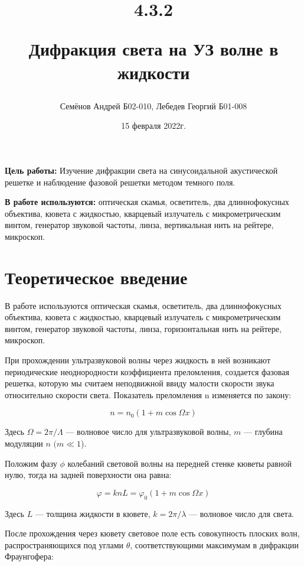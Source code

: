 \documentclass[a4paper,12pt]{article}
\title{4.3.2

Дифракция света на УЗ волне в жидкости}
\date{15 февраля 2022г.}
\author{Семёнов Андрей Б02-010, Лебедев Георгий Б01-008}
\begin{document}
		\vspace{0.5 cm}
	\maketitle
	\vspace{0.5 cm}
	
	\textbf{Цель работы:} Изучение дифракции света на синусоидальной акустической решетке и наблюдение фазовой решетки методом темного поля.
	
	\textbf{В работе используются:} оптическая скамья, осветитель, два длиннофокусных объектива, кювета с жидкостью, кварцевый излучатель с микрометрическим винтом, генератор звуковой частоты, линза, вертикальная нить на рейтере, микроскоп.
	
	\section*{Теоретическое введение}
	
	В работе используются оптическая скамья, осветитель, два длиннофокусных объектива, кювета с жидкостью, кварцевый излучатель с микрометрическим винтом, генератор звуковой частоты, линза, горизонтальная нить на рейтере, микроскоп. 
	
	При прохождении ультразвуковой волны через жидкость в ней возникают периодические неоднородности коэффициента преломления, создается фазовая решетка, которую мы считаем неподвижной ввиду малости скорости звука относительно скорости света. Показатель
	преломления n изменяется по закону:
	
	\begin{equation}\label{}
	n = n_0 (1 + m \cos \Omega x)
	\end{equation}
	
	Здесь $ \Omega = 2 \pi / \Lambda $ --- волновое число для ультразвуковой волны, $ m $ --- глубина модуляции $ n $ $ (m \ll 1 $).
	
	Положим фазу $ \phi $ колебаний световой волны на передней стенке кюветы равной нулю, тогда на задней поверхности она равна:
	
	\begin{equation}\label{}
	\varphi  = k n L = \varphi_0 (1 + m \cos \Omega x)
	\end{equation}
	
	Здесь $ L $ --- толщина жидкости в кювете, $ k = 2 \pi / \lambda $ --- волновое число для света.
	
	После прохождения через кювету световое поле есть совокупность плоских волн, распространяющихся под углами $ \theta $, соответствующими максимумам в дифракции Фраунгофера:
	
\end{document}
